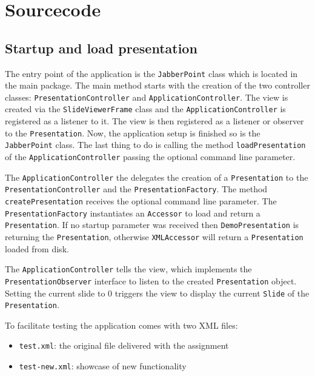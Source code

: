 \documentclass[a4paper]{article}
\begin{document}
\section{Sourcecode}
\subsection{Startup and load presentation}
The entry point of the application is the \texttt{JabberPoint} class which is located in the main package. The main method starts with the creation of the two controller classes: \texttt{PresentationController} and \texttt{ApplicationController}. The view is created via the \texttt{SlideViewerFrame} class and the \texttt{ApplicationController} is registered as a listener to it. The view is then registered as a listener or observer to the \texttt{Presentation}. Now, the application setup is finished so is the \texttt{JabberPoint} class. The last thing to  do is calling the method \texttt{loadPresentation} of the \texttt{ApplicationController} passing the optional command line parameter.

The \texttt{ApplicationController} the delegates the creation of a \texttt{Presentation} to the \texttt{PresentationController} and the \texttt{PresentationFactory}. The method \texttt{createPresentation}  receives the optional command line parameter. The \texttt{PresentationFactory} instantiates an \texttt{Accessor} to load and return a \texttt{Presentation}. If no startup parameter was received then \texttt{DemoPresentation} is returning the \texttt{Presentation}, otherwise \texttt{XMLAccessor} will return a \texttt{Presentation} loaded from disk.

The \texttt{ApplicationController} tells the view, which implements the \texttt{PresentationObserver} interface to listen to the created \texttt{Presentation} object. Setting the current slide to 0 triggers the view to display the current \texttt{Slide} of the \texttt{Presentation}.

To facilitate testing the application comes with two XML files: 
\begin{itemize}
\item \texttt{test.xml}: the original file delivered with the assignment
\item \texttt{test-new.xml}: showcase of new functionality
\end{itemize}
\end{document}
